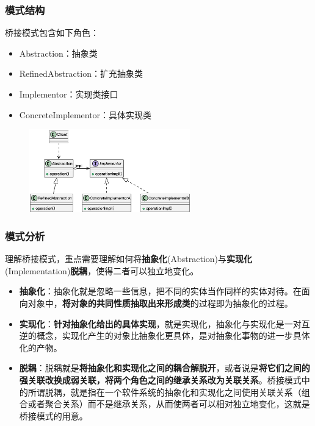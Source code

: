 \subsubsection{模式结构}
桥接模式包含如下角色：
\vspace{-0.8em}
\begin{multicols}{2}
    \begin{itemize}
        \item Abstraction：抽象类
        \item RefinedAbstraction：扩充抽象类
        \item Implementor：实现类接口
        \item ConcreteImplementor：具体实现类
    \end{itemize}
\end{multicols}
\vspace{-1em}

\begin{figure}[H]
    \vspace{-0.5em}
	\centering
	\includegraphics[width=0.62\textwidth]{images/桥接模式结构.eps}
    \vspace{-1em}
\end{figure}

\subsubsection{模式分析}
理解桥接模式，重点需要理解如何将\textbf{抽象化}(Abstraction)与\textbf{实现化}(Implementation)\textbf{脱耦}，使得二者可以独立地变化。
\begin{itemize}
    \item \textbf{抽象化}：抽象化就是忽略一些信息，把不同的实体当作同样的实体对待。在面向对象中，\textbf{将对象的共同性质抽取出来形成类}的过程即为抽象化的过程。
    \item \textbf{实现化}：\textbf{针对抽象化给出的具体实现}，就是实现化，抽象化与实现化是一对互逆的概念，实现化产生的对象比抽象化更具体，是对抽象化事物的进一步具体化的产物。
    \item \textbf{脱耦}：脱耦就是\textbf{将抽象化和实现化之间的耦合解脱开}，或者说是\textbf{将它们之间的强关联改换成弱关联，将两个角色之间的继承关系改为关联关系}。桥接模式中的所谓脱耦，就是指在一个软件系统的抽象化和实现化之间使用关联关系（组合或者聚合关系）而不是继承关系，从而使两者可以相对独立地变化，这就是桥接模式的用意。
\end{itemize}

